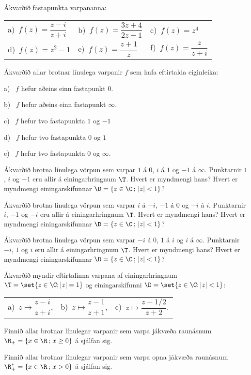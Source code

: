 \daemi Ákvarðið fastapunkta varpananna:

\smallskip
\begin{tabular}{lll}
a)\ $f(z)=\dfrac{z-i}{z+i}$  &
b)\ $f(z)=\dfrac{3z+4}{2z-1}$  &
c)\ $f(z)=z^4$  \\
d)\ $f(z)=z^2-1$&
e)\ $f(z)=\dfrac{z+1}{z}$  &
f)\ $f(z)=\dfrac{z}{z+i}$
\end{tabular}


\daemi Ákvarðið allar brotnar línulega varpanir $f$ sem hafa eftirtalda
eiginleika:

\smallskip
a) \ $f$ hefur aðeins einn fastapunkt $0$.

\smallskip
b) \ $f$ hefur aðeins einn fastapunkt $\infty$.

\smallskip
c) \ $f$ hefur tvo fastapunkta $1$ og $-1$

\smallskip
d) \ $f$ hefur tvo fastapunkta $0$ og $1$

\smallskip
e) \ $f$ hefur tvo fastapunkta $0$ og $\infty$.

\daemi  Ákvarðið brotna línulega vörpun  sem varpar $1$ á $0$,
$i$ á $1$ og $-1$ á $\infty$.  Punktarnir $1$, $i$ og $-1$ eru allir á
einingarhringnum $\T$.  Hvert er myndmengi hans?  Hvert er myndmengi 
einingarskífunnar $\D=\{z\in \C\,;\, |z|<1\}$?

\daemi  Ákvarðið brotna línulega vörpun  sem varpar $i$ á $-i$,
$-1$ á $0$ og $-i$ á $i$.  Punktarnir $i$, $-1$ og $-i$ eru allir á
einingarhringnum $\T$.  Hvert er myndmengi hans?  Hvert er myndmengi 
einingarskífunnar $\D=\{z\in \C\,;\, |z|<1\}$?


\daemi  Ákvarðið brotna línulega vörpun  sem varpar $-i$ á $0$,
$1$ á $i$ og $i$ á $\infty$.  Punktarnir $-i$, $1$ og $i$ eru allir á
einingarhringnum $\T$.  Hvert er myndmengi hans?  Hvert er myndmengi 
einingarskífunnar $\D=\{z\in \C\,;\, |z|<1\}$?

\daemi Ákvarðið myndir eftirtalinna varpana af einingarhringnum $\T=\set{z\in \C; 
|z|=1}$ og einingarskífunni $\D=\set{z\in \C;  |z|<1}$:

\smallskip
\begin{tabular}{lll}
a)\ $z\mapsto \dfrac{z-i}{z+i}$,  &
b)\ $z\mapsto \dfrac{z-1}{z+1}$,  &
c)\ $z\mapsto \dfrac{z-1/2}{z+2}$.
\end{tabular}

\daemi Finnið allar brotnar línulegar varpanir sem varpa jákvæða
raunásnum $\R_+=\{x\in \R\,;\, x\geq 0\}$ á sjálfan sig.

\daemi Finnið allar brotnar línulegar varpanir sem varpa opna jákvæða 
raunásnum $\R_+^*=\{x\in \R\,;\, x>0\}$ á sjálfan sig.


